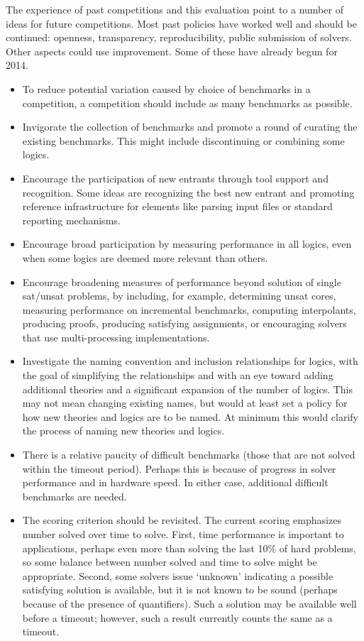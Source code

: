 \documentclass{eptcs}
\begin{document}
The experience of past competitions and this evaluation point to a number of ideas for future competitions. Most past policies have worked well and should be continued: openness, transparency, reproducibility, public submission of solvers. Other aspects could use improvement. Some of these have already begun for 2014.
\begin{itemize}
\item To reduce potential variation caused by choice of benchmarks in a competition, a competition should include as many benchmarks as possible.
\item Invigorate the collection of benchmarks and promote a round of curating the existing benchmarks. This might include discontinuing or combining some logics.
\item Encourage the participation of new entrants through tool support and recognition. Some ideas are recognizing the best new entrant and promoting reference infrastructure for elements like parsing input files or standard reporting mechanisms.
\item Encourage broad participation by measuring performance in all logics, even when some logics are deemed more relevant than others.
\item Encourage broadening measures of performance beyond solution of single sat/unsat problems, by including, for example, determining unsat cores, measuring performance on incremental benchmarks, computing interpolants, producing proofs, producing satisfying assignments, or encouraging solvers that use multi-processing implementations.
\item Investigate the naming convention and inclusion relationships for logics, with the goal of simplifying the relationships and with an eye toward adding additional theories and a significant expansion of the number of logics. This may not mean changing existing names, but would at least set a policy for how new theories and logics are to be named. At minimum this would clarify the process of naming new theories and logics.
\item There is a relative paucity of difficult benchmarks (those that are not solved within the timeout period). Perhaps this is because of progress in solver performance and in hardware speed. In either case, additional difficult benchmarks are needed.
\item The scoring criterion should be revisited. The current scoring emphasizes number solved over time to solve. First, time performance is important to applications, perhaps even more than solving the last 10\% of hard problems, so some balance between number solved and time to solve might be appropriate. Second, some solvers issue `unknown' indicating a possible satisfying solution is available, but it is not known to be sound (perhaps because of the presence of quantifiers). Such a solution may be available well before a timeout; however, such a result currently counts the same as a timeout.
\end{itemize}
\end{document}
